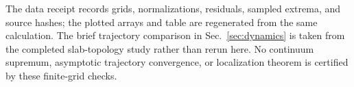 \documentclass[aps,prb,onecolumn,nofootinbib,superscriptaddress]{revtex4-2}
\begin{document}
The data receipt records grids, normalizations, residuals, sampled extrema,
and source hashes; the plotted arrays and table are regenerated from the
same calculation. The brief trajectory comparison in Sec.~\ref{sec:dynamics}
is taken from the completed slab-topology study rather than rerun here.
No continuum supremum, asymptotic trajectory convergence, or localization
theorem is certified by these finite-grid checks.



\end{document}
